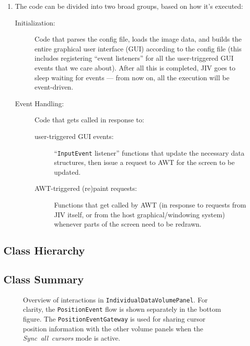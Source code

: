 \documentclass[11pt]{article}
\begin{document}
\begin{enumerate}
\item The code can be divided into two broad groups, based on how it's
  executed:
  \begin{description}
  \item[Initialization:] Code that parses the config file, loads the
    image data, and builds the entire graphical user interface (GUI)
    according to the config file (this includes registering ``event
    listeners'' for all the user-triggered GUI events that we care
    about). After all this is completed, JIV goes to sleep waiting for
    events --- from now on, all the execution will be event-driven.
  \item[Event Handling:] Code that gets called in response to:
    \begin{description}
    \item[user-triggered GUI events:] ``\texttt{InputEvent} listener''
      functions that update the necessary data structures, then issue
      a request to AWT for the screen to be updated.
    \item[AWT-triggered (re)paint requests:] Functions that get called
      by AWT (in response to requests from JIV itself, or from the
      host graphical/windowing system) whenever parts of the screen
      need to be redrawn. 
    \end{description}
  \end{description}



\end{enumerate}


\subsection{Class Hierarchy}
\label{sec:tree}

\subsection{Class Summary}
\label{sec:summary}


\begin{figure}[p]
\begin{center}
\end{center}
\caption[Overview of interactions in
\texttt{IndividualDataVolumePanel}]{Overview of interactions in
  \texttt{IndividualDataVolumePanel}. For clarity, the
  \mbox{\texttt{PositionEvent}} flow is shown separately in the bottom
  figure. The \mbox{\texttt{PositionEventGateway}} is used for sharing
  cursor position information with the other volume panels when the
  \mbox{\emph{Sync all cursors}} mode is active.}
\label{fig:IndividualDataVolumePanel}
\end{figure}
\end{document}
